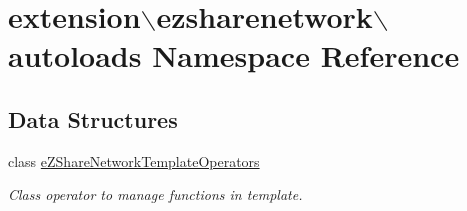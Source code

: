 \hypertarget{namespaceextension_1_1ezsharenetwork_1_1autoloads}{\section{extension$\backslash$ezsharenetwork$\backslash$autoloads Namespace Reference}
\label{namespaceextension_1_1ezsharenetwork_1_1autoloads}
}
\subsection*{Data Structures}
\begin{DoxyCompactItemize}
\item 
class \hyperlink{classextension_1_1ezsharenetwork_1_1autoloads_1_1e_z_share_network_template_operators}{e\-Z\-Share\-Network\-Template\-Operators}
\begin{DoxyCompactList}\small\item\em Class operator to manage functions in template. \end{DoxyCompactList}\end{DoxyCompactItemize}
